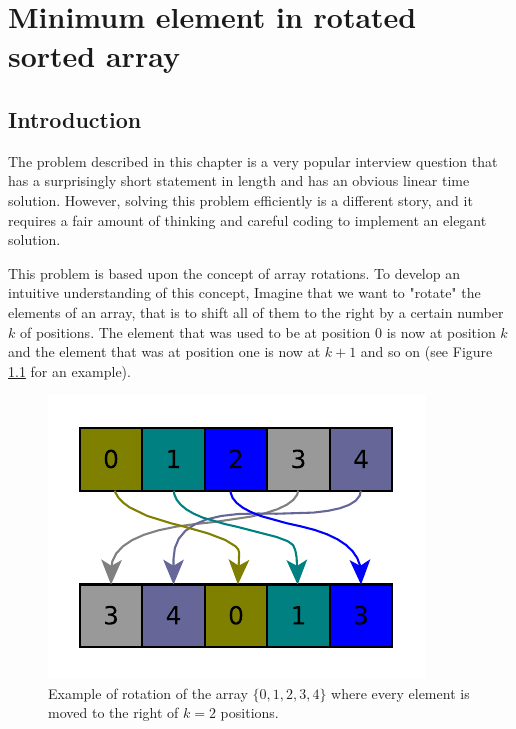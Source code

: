 %

\chapter{Minimum element in rotated sorted array}
\label{ch:min_rotated_array}
\section*{Introduction}
The problem described in this chapter is a very popular interview question that has a surprisingly short statement in length and has an obvious linear time solution. However, solving this problem efficiently is a different story, and it requires a fair amount of thinking and careful coding to implement an elegant solution.

This problem is based upon the concept of array rotations. To develop an intuitive understanding of this concept, Imagine that we want to "rotate" the elements of an array, that is to shift all of them to the right by a certain number $k$ of positions. The element that was used to be at position $0$ is now at position $k$ and the element that was at position one is now at $k+1$ and so on (see Figure \ref{fig:min_rotated_array:arrayrotation} for an example).

\begin{figure}
	\centering
	\includegraphics{sources/min_rotated_array/images/arrayrotation}
	\caption{Example of rotation of the array  $\{0,1,2,3,4\}$ where every element is moved to the right of $k=2$ positions.}
	\label{fig:min_rotated_array:arrayrotation}
\end{figure}


